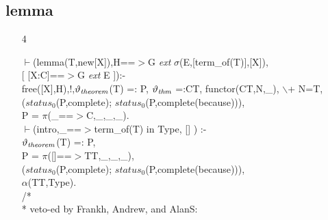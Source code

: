 \documentclass[11pt]{report}
\begin{document}
 \subsection{lemma}
 \begin{enumerate}
 \item[4]
\begin{sf}\begin{tabbing}
$\vdash$(lemma(T,new[X]),H==$>$G \mbox{\it ext} $\sigma$(E,[term\_\hspace{0.1em}of(T)],[X]), \\[-0.15ex]
\hspace{2em}[ [X:C]==$>$G \mbox{\it ext} E ]):-\\[-0.15ex]
\hspace{2em}free([X],H),!,$\vartheta_{\it theorem}$(T) =: P, $\vartheta_{\it thm}$ =:CT, functor(CT,N,\_\hspace{0.1em}), $\backslash$+ N=T, \\[-0.15ex]
\hspace{2em}($status_0$(P,complete); $status_0$(P,complete(because))),\\[-0.15ex]
\hspace{2em}P = $\pi$(\_\hspace{0.1em}==$>$C,\_\hspace{0.1em},\_\hspace{0.1em},\_\hspace{0.1em}).\\[-0.15ex]
$\vdash$(intro,\_\hspace{0.1em}==$>$term\_\hspace{0.1em}of(T) in Type, [] ) :-\\[-0.15ex]
\hspace{2em}$\vartheta_{\it theorem}$(T) =: P,\\[-0.15ex]
\hspace{2em}P = $\pi$([]==$>$TT,\_\hspace{0.1em},\_\hspace{0.1em},\_\hspace{0.1em}),\\[-0.15ex]
\hspace{2em}($status_0$(P,complete); $status_0$(P,complete(because))),\\[-0.15ex]
\hspace{2em}$\alpha$(TT,Type).\\[-0.15ex]
/*\\[-0.15ex]
\hspace{0em}* veto-ed by Frankh, Andrew, and AlanS:\\[-0.15ex]

\end{tabbing}
\end{sf}
\end{enumerate}
\end{document}

